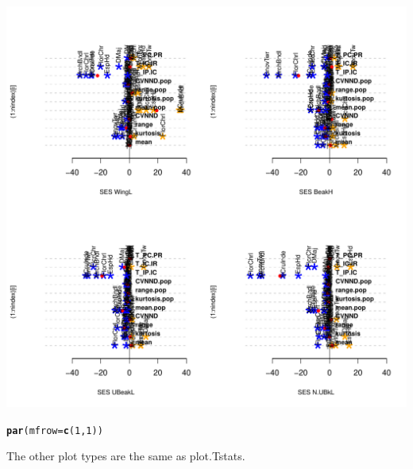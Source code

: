 \documentclass[12pt]{article}\usepackage[]{graphicx}\usepackage[]{color}
\makeatletter
\def\maxwidth{ %
  \ifdim\Gin@nat@width>\linewidth
    \linewidth
  \else
    \Gin@nat@width
  \fi
}
\newcommand{\hlnum}[1]{\textcolor[rgb]{0.686,0.059,0.569}{#1}}%
\newcommand{\hlstd}[1]{\textcolor[rgb]{0.345,0.345,0.345}{#1}}%
\newcommand{\hlkwc}[1]{\textcolor[rgb]{0.333,0.667,0.333}{#1}}%
\newcommand{\hlkwd}[1]{\textcolor[rgb]{0.737,0.353,0.396}{\textbf{#1}}}%
\newenvironment{kframe}{%
 \def\at@end@of@kframe{}%
 \ifinner\ifhmode%
  \def\at@end@of@kframe{\end{minipage}}%
  \begin{minipage}{\columnwidth}%
 \fi\fi%
 \def\FrameCommand##1{\hskip\@totalleftmargin \hskip-\fboxsep
 \colorbox{shadecolor}{##1}\hskip-\fboxsep
     \hskip-\linewidth \hskip-\@totalleftmargin \hskip\columnwidth}%
 \MakeFramed {\advance\hsize-\width
   \@totalleftmargin\z@ \linewidth\hsize
   \@setminipage}}%
 {\par\unskip\endMakeFramed%
 \at@end@of@kframe}
\newenvironment{knitrout}{}{} %
\makeatother
\begin{document}
\begin{knitrout}
\includegraphics[width=\maxwidth]{figure/unnamed-chunk-492} 
\begin{kframe}\begin{alltt}
\hlkwd{par}\hlstd{(}\hlkwc{mfrow} \hlstd{=} \hlkwd{c}\hlstd{(}\hlnum{1}\hlstd{,}\hlnum{1}\hlstd{))}
\end{alltt}
\end{kframe}
\end{knitrout}

The other plot types are the same as plot.Tstats.
\end{document}
